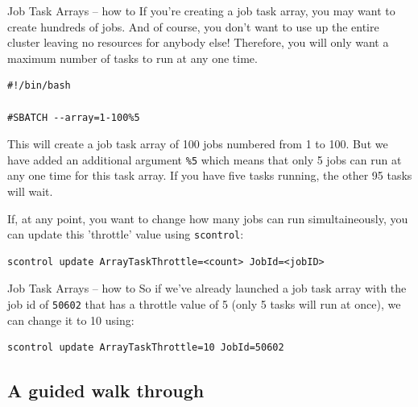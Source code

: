 \documentclass[10pt]{beamer}
\begin{document}
\begin{frame}[label={sec:org272a0d9},fragile]{Job Task Arrays -- how to}
 If you're creating a job task array, you may want to create hundreds of
jobs. And of course, you don't want to use up the entire cluster leaving no
resources for anybody else! Therefore, you will only want a maximum number of
tasks to run at any one time.

\begin{verbatim}
#!/bin/bash

#SBATCH --array=1-100%5
\end{verbatim}

This will create a job task array of 100 jobs numbered from 1 to 100. But we
have added an additional argument \texttt{\%5} which means that only 5 jobs can run at any
one time for this task array. If you have five tasks running, the other 95 tasks
will wait.

If, at any point, you want to change how many jobs can run simultaineously, you
can update this 'throttle' value using \texttt{scontrol}:

\begin{verbatim}
scontrol update ArrayTaskThrottle=<count> JobId=<jobID>
\end{verbatim}
\end{frame}

\begin{frame}[label={sec:org6509d40},fragile]{Job Task Arrays -- how to}
 So if we've already launched a job task array with the job id of \texttt{50602} that has
a throttle value of 5 (only 5 tasks will run at once), we can change it to 10
using:

\begin{verbatim}
scontrol update ArrayTaskThrottle=10 JobId=50602
\end{verbatim}
\end{frame}

\subsection{A guided walk through}
\label{sec:org259c5f4}
\end{document}
